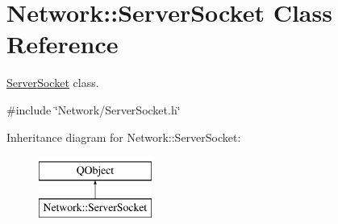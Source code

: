 \hypertarget{class_network_1_1_server_socket}{}\section{Network\+:\+:Server\+Socket Class Reference}
\label{class_network_1_1_server_socket}


\hyperlink{class_network_1_1_server_socket}{Server\+Socket} class.  




{\ttfamily \#include \char`\"{}Network/\+Server\+Socket.\+h\char`\"{}}

Inheritance diagram for Network\+:\+:Server\+Socket\+:\begin{figure}[H]
\begin{center}
\leavevmode
\includegraphics[height=2.000000cm]{class_network_1_1_server_socket}
\end{center}
\end{figure}
